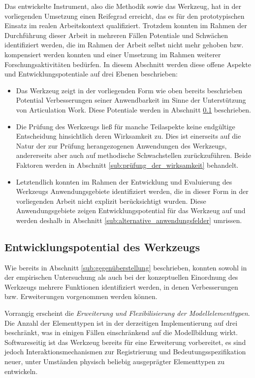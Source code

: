 Das entwickelte Instrument, also die Methodik sowie das Werkzeug, hat in der vorliegenden Umsetzung einen Reifegrad erreicht, das es für den prototypischen Einsatz im realen Arbeitskontext qualifiziert. Trotzdem konnten im Rahmen der Durchführung dieser Arbeit in mehreren Fällen Potentiale und Schwächen identifiziert werden, die im Rahmen der Arbeit selbst nicht mehr gehoben bzw. kompensiert werden konnten und einer Umsetzung im Rahmen weiterer Forschungsaktivitäten bedürfen. In diesem Abschnitt werden diese offene Aspekte und Entwicklungspotentiale auf drei Ebenen beschrieben:

\begin{itemize}
	\item Das Werkzeug zeigt in der vorliegenden Form wie oben bereits beschrieben Potential Verbesserungen seiner Anwendbarkeit im Sinne der Unterstützung von Articulation Work. Diese Potentiale werden in Abschnitt \ref{sub:entwicklungspotential_des_werkzeugs} beschrieben.
	\item Die Prüfung des Werkzeugs ließ für manche Teilaspekte keine endgültige Entscheidung hinsichtlich deren Wirksamkeit zu. Dies ist einerseits auf die Natur der zur Prüfung herangezogenen Anwendungen des Werkzeugs, andererseits aber auch auf methodische Schwachstellen zurückzuführen. Beide Faktoren werden in Abschnitt \ref{sub:prüfung_der_wirksamkeit} behandelt.
	\item Letztendlich konnten im Rahmen der Entwicklung und Evaluierung des Werkzeugs Anwendungsgebiete identifiziert werden, die in dieser Form in der vorliegenden Arbeit nicht explizit berücksichtigt wurden. Diese Anwendungsgebiete zeigen Entwicklungspotential für das Werkzeug auf und werden deshalb in Abschnitt \ref{sub:alternative_anwendungsfelder} umrissen.
\end{itemize}

\subsection{Entwicklungspotential des Werkzeugs} %
\label{sub:entwicklungspotential_des_werkzeugs}

Wie bereits in Abschnitt \ref{sub:gegenüberstellung} beschrieben, konnten sowohl in der empirischen Untersuchung als auch bei der konzeptuellen Einordnung des Werkzeugs mehrere Funktionen identifiziert werden, in denen Verbesserungen bzw. Erweiterungen vorgenommen werden können.

Vorrangig erscheint die \emph{Erweiterung und Flexibilisierung der Modellelementtypen}. Die Anzahl der Elementtypen ist in der derzeitigen Implementierung auf drei beschränkt, was in einigen Fällen einschränkend auf die Modellbildung wirkt. Softwareseitig ist das Werkzeug bereits für eine Erweiterung vorbereitet, es sind jedoch Interaktionsmechanismen zur Registrierung und Bedeutungsspezifikation neuer, unter Umständen physisch beliebig ausgeprägter Elementtypen zu entwickeln.

